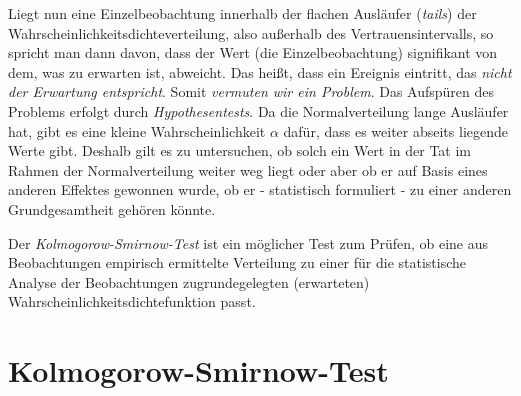 Liegt nun eine Einzelbeobachtung innerhalb der flachen
Ausläufer (\textsl{tails}) der Wahrscheinlichkeitsdichteverteilung,
also außerhalb des Vertrauensintervalls, so
spricht man dann davon, dass der Wert (die Einzelbeobachtung)
signifikant von dem, was zu erwarten ist, abweicht. Das heißt, dass ein Ereignis eintritt,
das \textsl{nicht der Erwartung entspricht}. Somit \textsl{vermuten wir ein Problem}. Das Aufspüren
des Problems erfolgt durch \textsl{Hypothesentests}. Da die Normalverteilung
lange Ausläufer hat, gibt es eine kleine Wahrscheinlichkeit $\alpha$ dafür, dass es
weiter abseits liegende Werte gibt. Deshalb gilt es zu untersuchen,
ob solch ein Wert in der Tat im Rahmen der Normalverteilung weiter weg liegt
oder aber ob er auf Basis eines anderen Effektes gewonnen
wurde, ob er - statistisch formuliert - zu einer anderen Grundgesamtheit gehören könnte.

Der \textsl{Kolmogorow-Smirnow-Test} ist ein möglicher Test zum Prüfen, ob eine aus Beobachtungen
empirisch ermittelte Verteilung zu einer für die statistische Analyse der Beobachtungen
zugrundegelegten (erwarteten) Wahrscheinlichkeitsdichtefunktion passt.


\section{Kolmogorow-Smirnow-Test}


